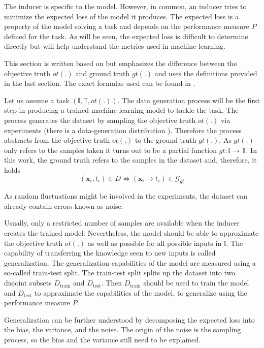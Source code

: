 The inducer is specific to the model. However, in common, an inducer tries to minimize the expected loss of the model it produces. The expected loss is a property of the model solving a task and depends on the performance measure $P$ defined for the task. As will be seen, the expected loss is difficult to determine directly but will help understand the metrics used in machine learning. \cite{bishop2006pattern}

This section is written based on \cite{bishop2006pattern} but emphasizes the difference between the objective truth $ot(.)$ and ground truth $gt(.)$ and uses the definitions provided in the last section. The exact formulas used can be found in \cite{bishop2006pattern}.

Let us assume a task $(\mathbb{I}, \mathbb{T}, ot(.))$. The data generation process will be the first step in producing a trained machine learning model to tackle the task. The process generates the dataset by sampling the objective truth $ot(.)$ via experiments (there is a data-generation distribution \cite{bengio2017deep}). Therefore the process abstracts from the objective truth $ot(.)$ to the ground truth $gt(.)$. As $gt(.)$ only refers to the samples taken it turns out to be a partial function $gt: \mathbb{I} \to \mathbb{T}$. In this work, the ground truth refers to the samples in the dataset and, therefore, it holds
\[(\mathbf{x}_i,t_i) \in D \Longleftrightarrow (\mathbf{x}_i \mapsto t_i) \in \mathcal{G}_{gt}\]

As random fluctuations might be involved in the experiments, the dataset can already contain errors known as noise.

Usually, only a restricted number of samples are available when the inducer creates the trained model. Nevertheless, the model should be able to approximate the objective truth $ot(.)$ as well as possible for all possible inputs in $\mathbb{I}$. The capability of transferring the knowledge seen to new inputs is called generalization. The generalization capabilities of the model are measured using a so-called train-test split. The train-test split splits up the dataset into two disjoint subsets $D_{\text{train}}$ and $D_{\text{test}}$. Then $D_{\text{train}}$ should be used to train the model and $D_{\text{test}}$ to approximate the capabilities of the model, to generalize using the performance measure $P$. 

Generalization can be further understood by decomposing the expected loss into the bias, the variance, and the noise. The origin of the noise is the sampling process, so the bias and the variance still need to be explained.

